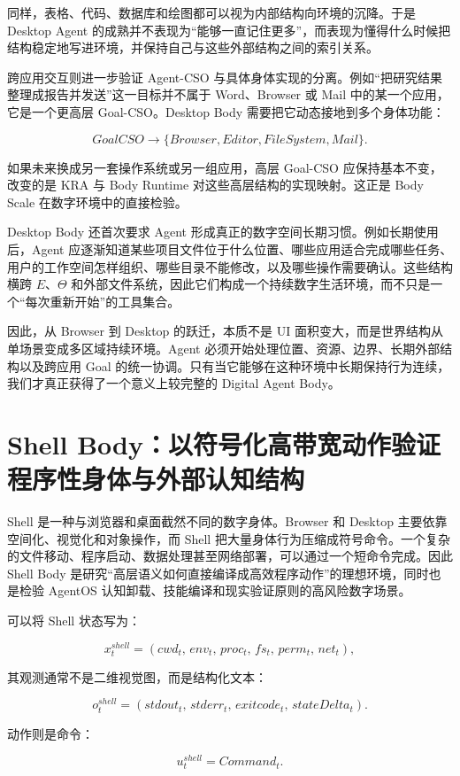 同样，表格、代码、数据库和绘图都可以视为内部结构向环境的沉降。于是 Desktop Agent 的成熟并不表现为“能够一直记住更多”，而表现为懂得什么时候把结构稳定地写进环境，并保持自己与这些外部结构之间的索引关系。

跨应用交互则进一步验证 Agent-CSO 与具体身体实现的分离。例如“把研究结果整理成报告并发送”这一目标并不属于 Word、Browser 或 Mail 中的某一个应用，它是一个更高层 Goal-CSO。Desktop Body 需要把它动态接地到多个身体功能：

$$
GoalCSO
\rightarrow
\{
Browser,
Editor,
FileSystem,
Mail
\}.
$$

如果未来换成另一套操作系统或另一组应用，高层 Goal-CSO 应保持基本不变，改变的是 KRA 与 Body Runtime 对这些高层结构的实现映射。这正是 Body Scale 在数字环境中的直接检验。

Desktop Body 还首次要求 Agent 形成真正的数字空间长期习惯。例如长期使用后，Agent 应逐渐知道某些项目文件位于什么位置、哪些应用适合完成哪些任务、用户的工作空间怎样组织、哪些目录不能修改，以及哪些操作需要确认。这些结构横跨 $E$、$\Theta$ 和外部文件系统，因此它们构成一个持续数字生活环境，而不只是一个“每次重新开始”的工具集合。

因此，从 Browser 到 Desktop 的跃迁，本质不是 UI 面积变大，而是世界结构从单场景变成多区域持续环境。Agent 必须开始处理位置、资源、边界、长期外部结构以及跨应用 Goal 的统一协调。只有当它能够在这种环境中长期保持行为连续，我们才真正获得了一个意义上较完整的 Digital Agent Body。

\section{Shell Body：以符号化高带宽动作验证程序性身体与外部认知结构}

Shell 是一种与浏览器和桌面截然不同的数字身体。Browser 和 Desktop 主要依靠空间化、视觉化和对象操作，而 Shell 把大量身体行为压缩成符号命令。一个复杂的文件移动、程序启动、数据处理甚至网络部署，可以通过一个短命令完成。因此 Shell Body 是研究“高层语义如何直接编译成高效程序动作”的理想环境，同时也是检验 AgentOS 认知卸载、技能编译和现实验证原则的高风险数字场景。

可以将 Shell 状态写为：

$$
x_t^{shell}
=
(
cwd_t,\,
env_t,\,
proc_t,\,
fs_t,\,
perm_t,\,
net_t
),
$$

其观测通常不是二维视觉图，而是结构化文本：

$$
o_t^{shell}
=
(
stdout_t,\,
stderr_t,\,
exitcode_t,\,
stateDelta_t
).
$$

动作则是命令：

$$
u_t^{shell}
=
Command_t.
$$

